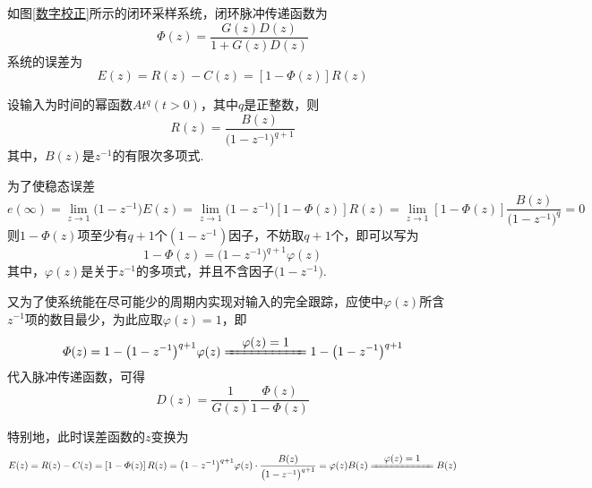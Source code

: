 如图\ref{数字校正}所示的闭环采样系统，闭环脉冲传递函数为
\begin{equation}
	\varPhi(z) = \dfrac{G(z)D(z)}{1+G(z)D(z)}
\end{equation}
系统的误差为
\begin{equation}
	E(z) = R(z) - C(z) = \left[1 - \varPhi(z)\right]R(z)
\end{equation}

设输入为时间的幂函数$At^q(t>0)$，其中$q$是正整数，则
\begin{equation}
	R(z) = \dfrac{B(z)}{\big(1-z^{-1}\big)^{q+1}}
\end{equation}
其中，$B(z)$是$z^{-1}$的有限次多项式.
\vspace*{0.5em}

为了使稳态误差
\begin{equation}
	e(\infty) = \lim\limits_{z\to 1}\big(1-z^{-1}\big)E(z) = \lim\limits_{z\to 1}\big(1-z^{-1}\big)\left[1-\varPhi(z)\right]R(z) = \lim\limits_{z\to 1}\left[1-\varPhi(z)\right]\dfrac{B(z)}{\big(1-z^{-1}\big)^{q}} = 0
\end{equation}
则$1-\varPhi(z)$项至少有$q+1$个$(1-z^{-1})$因子，不妨取$q+1$个，即可以写为
\begin{equation}
	1-\varPhi(z) = \big(1-z^{-1}\big)^{q+1}\varphi(z)
\end{equation}
其中，$\varphi(z)$是关于$z^{-1}$的多项式，并且不含因子$\big(1-z^{-1}\big)$.
\vspace*{0.5em}

又为了使系统能在尽可能少的周期内实现对输入的完全跟踪，应使中$\varphi(z)$所含$z^{-1}$项的数目最少，为此应取$\varphi(z) = 1$，即
\begin{equation}
	\varPhi(z) = 1 - \big(1-z^{-1}\big)^{q+1}\varphi(z) \xlongequal{\textstyle \quad \varphi(z) = 1\quad}  1 - \big(1-z^{-1}\big)^{q+1}
\end{equation}
代入脉冲传递函数，可得
\begin{equation}
	D(z) = \dfrac{1}{G(z)}\dfrac{\varPhi(z)}{1 - \varPhi(z)}
\end{equation}

特别地，此时误差函数的$z$变换为
\begin{equation}
	E(z) = R(z) - C(z) = \left[1 - \varPhi(z)\right]R(z) = \big(1-z^{-1}\big)^{q+1}\varphi(z) \cdot \dfrac{B(z)}{\big(1-z^{-1}\big)^{q+1}} = \varphi(z)B(z)\xlongequal{\textstyle \quad \varphi(z) = 1\quad} B(z)
\end{equation}

